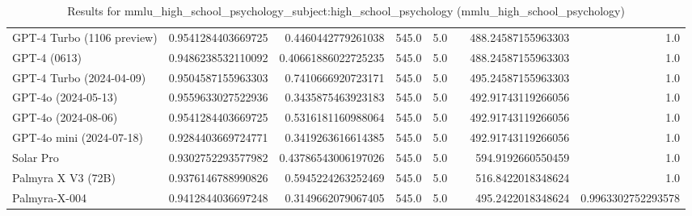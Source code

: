 \begin{table}[htp]
{\begin{tabular}{lrrrrrrr}
GPT-4 Turbo (1106 preview) & 0.9541284403669725 & 0.4460442779261038 & 545.0 & 5.0 &  & 488.24587155963303 & 1.0 \\
GPT-4 (0613) & 0.9486238532110092 & 0.40661886022725235 & 545.0 & 5.0 &  & 488.24587155963303 & 1.0 \\
GPT-4 Turbo (2024-04-09) & 0.9504587155963303 & 0.7410666920723171 & 545.0 & 5.0 &  & 495.24587155963303 & 1.0 \\
GPT-4o (2024-05-13) & 0.9559633027522936 & 0.3435875463923183 & 545.0 & 5.0 &  & 492.91743119266056 & 1.0 \\
GPT-4o (2024-08-06) & 0.9541284403669725 & 0.5316181160988064 & 545.0 & 5.0 &  & 492.91743119266056 & 1.0 \\
GPT-4o mini (2024-07-18) & 0.9284403669724771 & 0.3419263616614385 & 545.0 & 5.0 &  & 492.91743119266056 & 1.0 \\
Solar Pro & 0.9302752293577982 & 0.43786543006197026 & 545.0 & 5.0 &  & 594.9192660550459 & 1.0 \\
Palmyra X V3 (72B) & 0.9376146788990826 & 0.5945224263252469 & 545.0 & 5.0 &  & 516.8422018348624 & 1.0 \\
Palmyra-X-004 & 0.9412844036697248 & 0.3149662079067405 & 545.0 & 5.0 &  & 495.2422018348624 & 0.9963302752293578 \\
\bottomrule
\end{tabular}}
\caption{Results for mmlu_high_school_psychology_subject:high_school_psychology (mmlu_high_school_psychology)}
\label{fig:mmlu_high_school_psychology_subject:high_school_psychology (mmlu_high_school_psychology)}
\end{table}